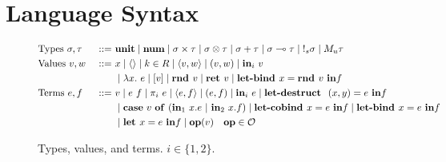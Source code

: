 \section{Language Syntax}

\begin{figure}[tbp]
  \begin{alignat*}{3}
         &\text{Types } \sigma, \tau &::=~ &\mathbf{unit}
         \mid \num
         \mid \sigma \times \tau 
         \mid \sigma \otimes \tau
         \mid \sigma + \tau 
         \mid \sigma \multimap \tau
         \mid {\bang{s} \sigma}
         \mid {M_u \tau}
         \\
         &\text{Values } v, w \ &::=~ &x
         \mid \langle \rangle
         \mid k \in R
         \mid \langle v,w \rangle 
         \mid (v, w)
         \mid \tin_i \ v
         \\
         & & & \mid \lambda x.~e 
         \mid [v]
         \mid\rnd v
         \mid {\ret v} 
         \mid \letbind x = \rnd v \ \tin f \\
         &\text{Terms } e, f &::=~ & v
         \mid e~f
         \mid {\pi}_i\ e
         \mid \langle e,f \rangle 
         \mid (e, f)
         \mid \tin_i \ e
         \mid \letdestruct \ (x,y) = e \ \tin f \\
         & & & \mid 
          \mathbf{case} \ v \ \mathbf{of} \ (\tin_1 \ x.e \ | \ \tin_2 \ x.f) 
         \mid \letcobind x = e \ \tin  f
         \mid {\letbind x = e \ \tin f} \\
         & & & \mid \letassign x  = e \ \tin  f 
         \mid \mathbf{op}(v) \quad \mathbf{op} \in \mathcal{O}
  \end{alignat*}
  \caption{Types, values, and terms. $i \in \{1, 2\}$.}
  \label{fig:syntax}
\end{figure}


